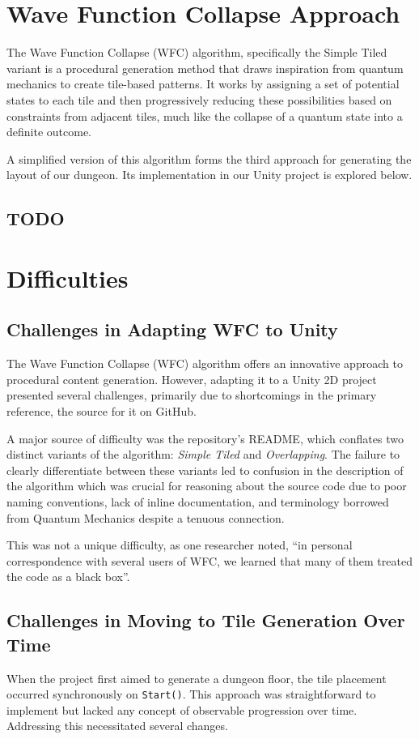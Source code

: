 \documentclass[a4paper, 12pt, one column, aas_macros]{article}
\begin{document}
\section{Wave Function Collapse Approach}
The Wave Function Collapse (WFC) algorithm, specifically the Simple Tiled variant is a procedural generation method that draws inspiration from quantum mechanics to create tile-based patterns. It works by assigning a set of potential states to each tile and then progressively reducing these possibilities based on constraints from adjacent tiles, much like the collapse of a quantum state into a definite outcome. 

A simplified version of this algorithm forms the third approach for generating the layout of our dungeon. Its implementation in our Unity project is explored below.

\subsection{TODO}

\section{Difficulties}
\subsection{Challenges in Adapting WFC to Unity}
The Wave Function Collapse (WFC) algorithm offers an innovative approach to procedural content generation. However, adapting it to a Unity 2D project presented several challenges, primarily due to shortcomings in the primary reference, the source for it on GitHub. \cite{mxgmn}

A major source of difficulty was the repository’s README, which conflates two distinct variants of the algorithm: \emph{Simple Tiled} and \emph{Overlapping}. The failure to clearly differentiate between these variants led to confusion in the description of the algorithm which was crucial for reasoning about the source code due to poor naming conventions, lack of inline documentation, and terminology borrowed from Quantum Mechanics despite a tenuous connection.

This was not a unique difficulty, as one researcher noted, ``in personal correspondence with several users of WFC, we learned that many of them treated the code as a black box''. \citep{karth}


\subsection{Challenges in Moving to Tile Generation Over Time}
When the project first aimed to generate a dungeon floor, the tile placement occurred synchronously on \texttt{Start()}. This approach was straightforward to implement but lacked any concept of observable progression over time. Addressing this necessitated several changes. 
\end{document}
